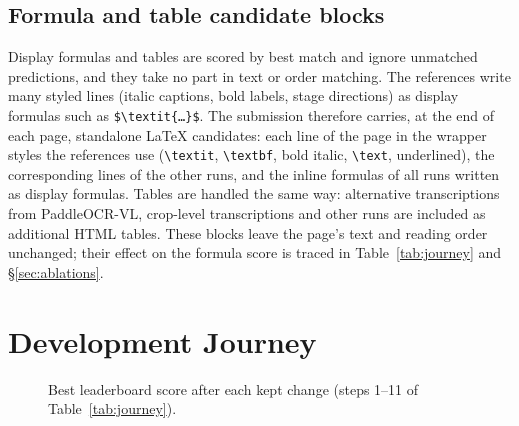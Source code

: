 \documentclass[11pt]{article}
\begin{document}
\subsection{Formula and table candidate blocks}
\label{sec:candidates}
Display formulas and tables are scored by best match and ignore unmatched predictions, and they take no part in text or order matching. The references write many styled lines (italic captions, bold labels, stage directions) as display formulas such as \texttt{\$\textbackslash textit\{\ldots\}\$}. The submission therefore carries, at the end of each page, standalone LaTeX candidates: each line of the page in the wrapper styles the references use (\texttt{\textbackslash textit}, \texttt{\textbackslash textbf}, bold italic, \texttt{\textbackslash text}, underlined), the corresponding lines of the other runs, and the inline formulas of all runs written as display formulas. Tables are handled the same way: alternative transcriptions from PaddleOCR-VL, crop-level transcriptions and other runs are included as additional HTML tables. These blocks leave the page's text and reading order unchanged; their effect on the formula score is traced in Table~\ref{tab:journey} and \S\ref{sec:ablations}.

\section{Development Journey}
\label{sec:journey}

\begin{figure}[t]
\centering
{}
\caption{Best leaderboard score after each kept change (steps 1--11 of Table~\ref{tab:journey}).}
\label{fig:journey}
\end{figure}
\end{document}
